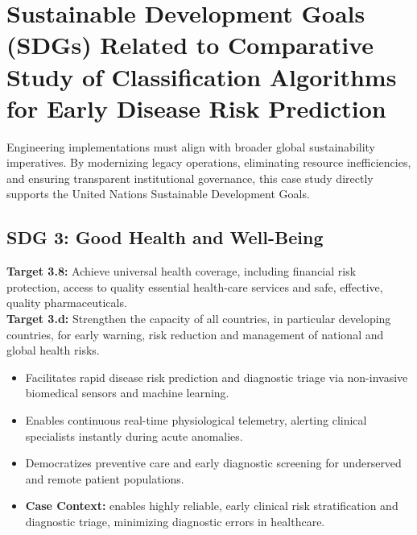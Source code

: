 \section{Sustainable Development Goals (SDGs) Related to Comparative Study of Classification Algorithms for Early Disease Risk Prediction}
Engineering implementations must align with broader global sustainability imperatives. By modernizing legacy operations, eliminating resource inefficiencies, and ensuring transparent institutional governance, this case study directly supports the United Nations Sustainable Development Goals.

\subsection{SDG 3: Good Health and Well-Being}
\noindent\textbf{Target 3.8:} Achieve universal health coverage, including financial risk protection, access to quality essential health-care services and safe, effective, quality pharmaceuticals. \\
\noindent\textbf{Target 3.d:} Strengthen the capacity of all countries, in particular developing countries, for early warning, risk reduction and management of national and global health risks.
\begin{itemize}
  \item Facilitates rapid disease risk prediction and diagnostic triage via non-invasive biomedical sensors and machine learning.
  \item Enables continuous real-time physiological telemetry, alerting clinical specialists instantly during acute anomalies.
  \item Democratizes preventive care and early diagnostic screening for underserved and remote patient populations.
  \item \textbf{Case Context:} enables highly reliable, early clinical risk stratification and diagnostic triage, minimizing diagnostic errors in healthcare.
\end{itemize}
